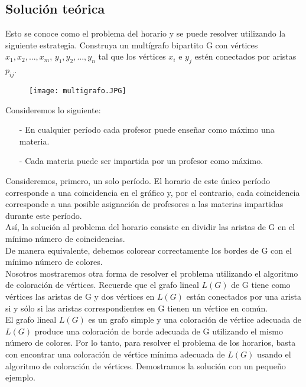 \documentclass[letterpaper,12pt]{article}
\begin{document}
    \subsection{Solución teórica}
    Esto se conoce como el problema del horario y se puede resolver utilizando la siguiente estrategia. Construya un multígrafo bipartito G con vértices $x_{1}, x_{2}, ..., x_{m}$, $y_{1}, y_{2}, ..., y_{n}$ tal que los vértices $x_{i}$ e $y_{j}$ estén conectados por aristas $p_{ij}$. \\
    \begin{figure} [h]
        \centering
        \texttt{[image: multigrafo.JPG]}
        \label{fig:my_label}
    \end{figure}
    \newpage
    Consideremos lo siguiente:
    \begin{itemize}
        \item [-] En cualquier período cada profesor puede enseñar como máximo una materia.
        \item[-] Cada materia puede ser impartida por un profesor como máximo.
    \end{itemize}
    Consideremos, primero, un solo período. El horario de este único período corresponde a una coincidencia en el gráfico y, por el contrario, cada coincidencia corresponde a una posible asignación de profesores a las materias impartidas durante este período. \\
    Así, la solución al problema del horario consiste en dividir las aristas de G en el mínimo número de coincidencias. \\
    De manera equivalente, debemos colorear correctamente los bordes de G con el mínimo número de colores. \\
    Nosotros mostraremos otra forma de resolver el problema utilizando el algoritmo de coloración de vértices. Recuerde que el grafo lineal $L(G)$ de G tiene como vértices las aristas de G y dos vértices en $L(G)$ están conectados por una arista si y sólo si las aristas correspondientes en G tienen un vértice en común. \\
    El grafo lineal $L(G)$ es un grafo simple y una coloración de vértice adecuada de $L(G)$ produce una coloración de borde adecuada de G utilizando el mismo número de colores. Por lo tanto, para resolver el problema de los horarios, basta con encontrar una coloración de vértice mínima adecuada de $L(G)$ usando el algoritmo de coloración de vértices. Demostramos la solución con un pequeño ejemplo.
    
\end{document}
